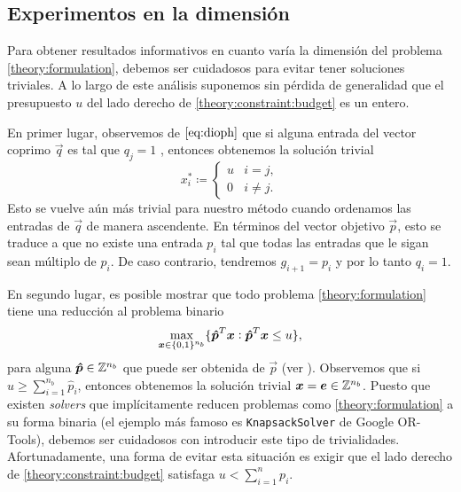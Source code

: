 \subsection{Experimentos en la dimensión}
\label{subsec:exp:fin:n}
\noindent
Para obtener resultados informativos en cuanto varía la dimensión del problema
\eqref{theory:formulation}, debemos ser cuidadosos para evitar tener soluciones triviales. A lo
largo de este análisis suponemos sin pérdida de generalidad que el presupuesto $u$ del lado derecho
de \eqref{theory:constraint:budget} es un entero.

En primer lugar, observemos de $\eqref{eq:dioph}$ que si alguna entrada del vector coprimo $\vec{q}$
es tal que $q_j = 1$ , entonces obtenemos la solución trivial
\begin{equation*}
	x_i^* \coloneq \begin{cases}
		u & i = j, \\
		0 & i \neq j.
	\end{cases}
\end{equation*}
Esto se vuelve aún más trivial para nuestro método cuando ordenamos las entradas de $\vec{q}$ de
manera ascendente. En términos del vector objetivo $\vec{p}$, esto se traduce a que no existe una
entrada $p_i$ tal que todas las entradas que le sigan sean múltiplo de $p_i$. De caso contrario,
tendremos $g_{i + 1} = p_i$ y por lo tanto $q_i = 1$.

En segundo lugar, es posible mostrar que todo problema \eqref{theory:formulation} tiene una
reducción al problema binario
\begin{equation*}
	\max_{\boldsymbol{x} \in \lbrace 0, 1 \rbrace^{n_b}} \lbrace  \boldsymbol{\hat{p}}^T\boldsymbol{x} \vcentcolon \boldsymbol{\hat{p}}^T\boldsymbol{x} \leq
	u \rbrace,
\end{equation*}
para alguna $\boldsymbol{\hat{p}} \in \mathbb{Z}^{n_b}$ que puede ser obtenida de $\vec{p}$ (ver \cite{martello}).
Observemos que si $u \geq \sum_{i=1}^{n_b}\hat{p}_i$, entonces obtenemos la solución trivial
$\boldsymbol{x} = \boldsymbol{e} \in \mathbb{Z}^{n_b}$. Puesto que existen \textit{solvers} que implícitamente reducen
problemas como \eqref{theory:formulation} a su forma binaria (el ejemplo más famoso es
\texttt{KnapsackSolver} de Google OR-Tools), debemos ser cuidadosos con introducir este tipo de
trivialidades. Afortunadamente, una forma de evitar esta situación es exigir que el lado derecho de
\eqref{theory:constraint:budget} satisfaga $u < \sum_{i=1}^{n}p_i$.

